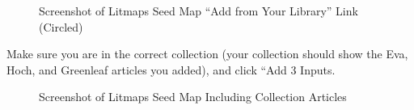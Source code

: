 \documentclass[
  letterpaper,
  DIV=11,
  numbers=noendperiod]{scrreprt}
\begin{document}
\begin{figure}

\caption{\label{fig-image9}Screenshot of Litmaps Seed Map ``Add from
Your Library'' Link (Circled)}


\end{figure}%

Make sure you are in the correct collection (your collection should show
the Eva, Hoch, and Greenleaf articles you added), and click ``Add 3
Inputs.

\begin{figure}

\caption{\label{fig-litmaps7}Screenshot of Litmaps Seed Map Including
Collection Articles}


\end{figure}%
\end{document}
